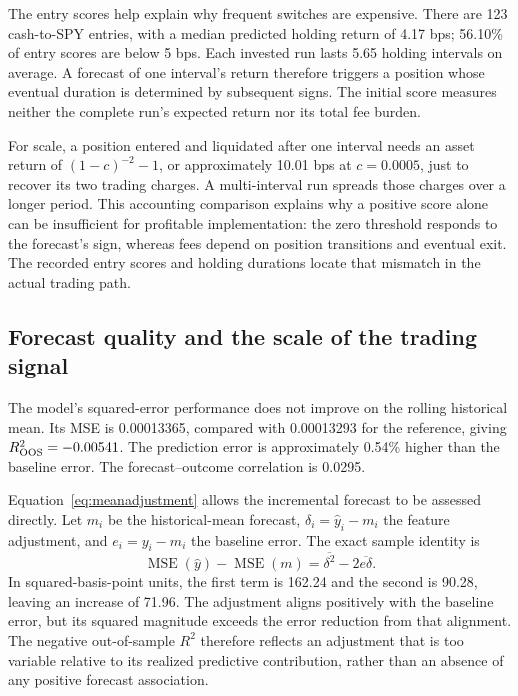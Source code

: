The entry scores help explain why frequent switches are expensive. There are 123 cash-to-SPY entries, with a median predicted holding return of 4.17 bps; 56.10\% of entry scores are below 5 bps. Each invested run lasts 5.65 holding intervals on average. A forecast of one interval's return therefore triggers a position whose eventual duration is determined by subsequent signs. The initial score measures neither the complete run's expected return nor its total fee burden.

For scale, a position entered and liquidated after one interval needs an asset return of $(1-c)^{-2}-1$, or approximately 10.01 bps at $c=0.0005$, just to recover its two trading charges. A multi-interval run spreads those charges over a longer period. This accounting comparison explains why a positive score alone can be insufficient for profitable implementation: the zero threshold responds to the forecast's sign, whereas fees depend on position transitions and eventual exit. The recorded entry scores and holding durations locate that mismatch in the actual trading path.

\subsection{Forecast quality and the scale of the trading signal}
The model's squared-error performance does not improve on the rolling historical mean. Its MSE is 0.00013365, compared with 0.00013293 for the reference, giving $R^2_{\mathrm{OOS}}=-0.00541{}$. The prediction error is approximately 0.54\% higher than the baseline error. The forecast--outcome correlation is 0.0295.

Equation~\eqref{eq:meanadjustment} allows the incremental forecast to be assessed directly. Let $m_i$ be the historical-mean forecast, $\delta_i=\widehat y_i-m_i$ the feature adjustment, and $e_i=y_i-m_i$ the baseline error. The exact sample identity is
\begin{equation}
\operatorname{MSE}(\widehat y)-\operatorname{MSE}(m)
=\overline{\delta^2}-2\overline{e\delta}.
\label{eq:mseparts}
\end{equation}
In squared-basis-point units, the first term is 162.24 and the second is 90.28, leaving an increase of 71.96. The adjustment aligns positively with the baseline error, but its squared magnitude exceeds the error reduction from that alignment. The negative out-of-sample $R^2$ therefore reflects an adjustment that is too variable relative to its realized predictive contribution, rather than an absence of any positive forecast association.

